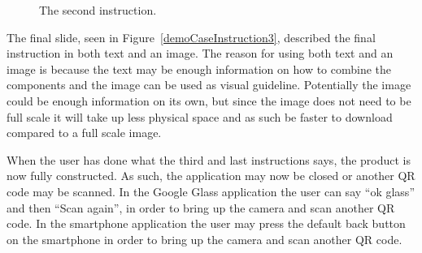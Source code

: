 	\begin{figure}[ht!]
		\centering
		\qquad
		\qquad
		\caption{The second instruction.}
		\label{demoCaseInstruction2}
	\end{figure}

The final slide, seen in Figure~\ref{demoCaseInstruction3}, described the final instruction in both text and an image. The reason for using both text and an image is because the text may be enough information on how to combine the components and the image can be used as visual guideline. Potentially the image could be enough information on its own, but since the image does not need to be full scale it will take up less physical space and as such be faster to download compared to a full scale image.

When the user has done what the third and last instructions says, the product is now fully constructed. As such, the application may now be closed or another QR code may be scanned. In the Google Glass application the user can say ``ok glass'' and then ``Scan again'', in order to bring up the camera and scan another QR code. In the smartphone application the user may press the default back button on the smartphone in order to bring up the camera and scan another QR code.

